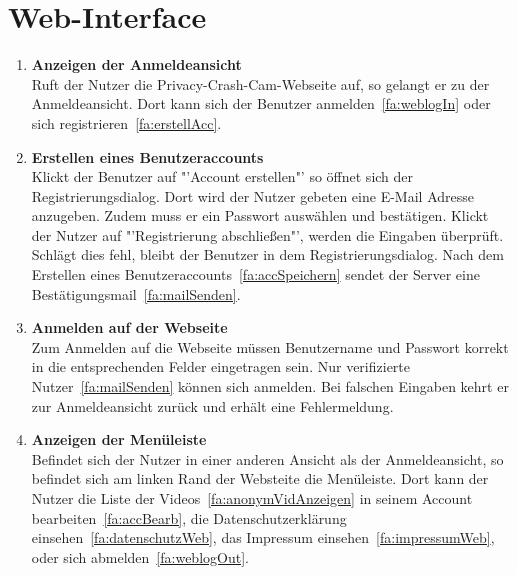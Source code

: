 




\section{\gls{Web-Interface}}
\begin{enumerate}
\renewcommand{\labelenumi}{\textbf{\theenumi}}
\renewcommand{\theenumi}{FA\arabic{enumi}0}
\setcounter{enumi}{299}
\item \label{fa:loginWeb} \textbf{Anzeigen der Anmeldeansicht} \hfill \\
Ruft der Nutzer die Privacy-Crash-Cam-Webseite auf, so gelangt er zu der Anmeldeansicht. Dort kann sich der Benutzer anmelden~\eqref{fa:weblogIn} oder sich registrieren~\eqref{fa:erstellAcc}.

\item \label{fa:erstellAcc}\textbf{Erstellen eines Benutzeraccounts} \hfill \\
Klickt der Benutzer auf "'Account erstellen"' so öffnet sich der Registrierungsdialog. Dort wird der Nutzer gebeten eine \gls{E-Mail} Adresse anzugeben. Zudem muss er ein Passwort auswählen und bestätigen. Klickt der Nutzer auf "'Registrierung abschließen"',  werden die Eingaben überprüft. Schlägt dies fehl, bleibt der Benutzer in dem Registrierungsdialog. Nach dem Erstellen eines Benutzeraccounts~\eqref{fa:accSpeichern} sendet der Server eine Bestätigungsmail~\eqref{fa:mailSenden}.

\item \label{fa:weblogIn}\textbf{Anmelden auf der Webseite} \hfill \\
Zum Anmelden auf die Webseite müssen Benutzername und Passwort korrekt in die entsprechenden Felder eingetragen sein. Nur verifizierte Nutzer~\eqref{fa:mailSenden} können sich anmelden. Bei falschen Eingaben kehrt er zur Anmeldeansicht zurück und erhält eine Fehlermeldung.

\item \textbf{Anzeigen der Menüleiste} \hfill \\
Befindet sich der Nutzer in einer anderen Ansicht als der Anmeldeansicht, so befindet sich am linken Rand der Websteite die Menüleiste. Dort kann der Nutzer die Liste der  Videos~\eqref{fa:anonymVidAnzeigen} in seinem Account bearbeiten~\eqref{fa:accBearb}, die Datenschutzerklärung einsehen~\eqref{fa:datenschutzWeb}, das Impressum einsehen~\eqref{fa:impressumWeb}, oder sich abmelden~\eqref{fa:weblogOut}.


\end{enumerate}
